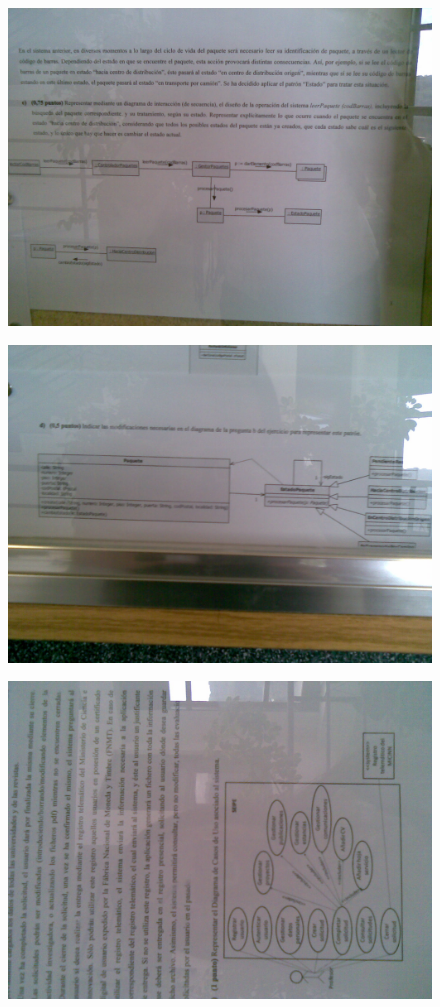\documentclass[12pt,a4paper]{report}
\begin{document}
\begin{figure}
  \includegraphics[width=\textwidth]{./images/jun/Imagen084.jpg}
\end{figure}
\begin{figure}
  \includegraphics[width=\textwidth]{./images/jun/Imagen086.jpg}
\end{figure}
\begin{figure}
  \includegraphics[width=\textwidth]{./images/jun/Imagen088.jpg}
\end{figure}
\end{document}
